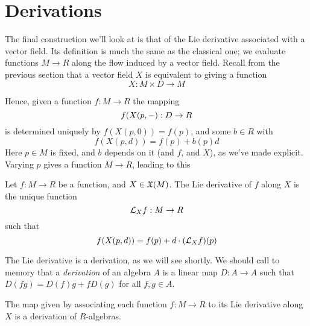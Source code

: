 \section{Derivations}
 The final construction we'll look at is that of the Lie derivative associated with a vector field. Its definition is much the same as the classical one; we evaluate functions \( M\to R \) along the flow induced by a vector field. Recall from the previous section that a vector field \( X \) is equivalent to giving a function
 \begin{equation*}
   X:M\times D\to M
 \end{equation*}

Hence, given a function \( f:M\to R \) the mapping
\begin{equation*}
  f(X(p,-):D\to R
\end{equation*}
is determined uniquely by \( f(X(p,0)) = f(p) \), and some \( b\in R \) with
\begin{equation*}
  f(X(p,d)) = f(p) + b(p)d
\end{equation*}
Here \( p\in M \) is fixed, and \( b \) depends on it (and \( f \), and \( X \)), as we've made explicit. Varying \( p \) gives a function \( M\to R \), leading to this

\begin{defn}
  Let \( f:M\to R \) be a function, and \( X\in \mathfrak X(M) \). The Lie derivative of \( f \) along \( X \) is the unique function
  \begin{equation*}
    \mathcal L_Xf:M\to R
  \end{equation*}
  such that
  \begin{equation*}
    f(X(p,d)) = f(p) + d\cdot(\mathcal L_Xf)(p)
  \end{equation*}
\end{defn}

The Lie derivative is a derivation, as we will see shortly. We should call to memory that a \emph{derivation} of an algebra \( A \) is a linear map \( D:A\to A \) such that \( D(fg) = D(f)g + fD(g) \) for all \( f,g\in A \).

\begin{proposition}
  The map given by associating each function \( f:M\to R \) to its Lie derivative along \( X \) is a derivation of \( R \)-algebras.
\end{proposition}

